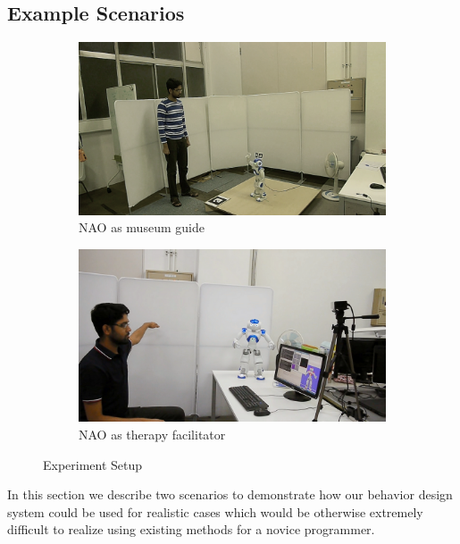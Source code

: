 \subsection{Example Scenarios}
\begin{figure}
\centering
\begin{subfigure}[t]{0.49\textwidth}
\includegraphics[width=\textwidth]{../thesis/assets/scenario_museum.png}
\caption[Experiment Setup 1]{NAO as museum guide}
\label{fig:scenario1_setup}
\end{subfigure}
\begin{subfigure}[t]{0.49\textwidth}
\includegraphics[width=\textwidth]{../thesis/assets/scenario_therapy.png}
\caption[Experiment Setup 2]{NAO as therapy facilitator}
\label{fig:scenario2_setup}
\end{subfigure}
\caption[Experiment Setup]{Experiment Setup}
\label{fig:scenarios_setup}
\end{figure}
	In this section we describe two scenarios to demonstrate how our behavior design system could be used for realistic cases which would be otherwise extremely difficult to realize using existing methods for a novice programmer.
